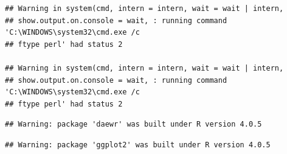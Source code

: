 \documentclass[
]{book}
\begin{document}
\begin{verbatim}
## Warning in system(cmd, intern = intern, wait = wait | intern,
## show.output.on.console = wait, : running command 'C:\WINDOWS\system32\cmd.exe /c
## ftype perl' had status 2

## Warning in system(cmd, intern = intern, wait = wait | intern,
## show.output.on.console = wait, : running command 'C:\WINDOWS\system32\cmd.exe /c
## ftype perl' had status 2
\end{verbatim}

\begin{verbatim}
## Warning: package 'daewr' was built under R version 4.0.5
\end{verbatim}

\begin{verbatim}
## Warning: package 'ggplot2' was built under R version 4.0.5
\end{verbatim}

\providecommand{\docline}[3]{\noalign{\global\setlength{\arrayrulewidth}{#1}}\arrayrulecolor[HTML]{#2}\cline{#3}}

\setlength{\tabcolsep}{8pt}

\renewcommand*{\arraystretch}{1.5}
\end{document}
